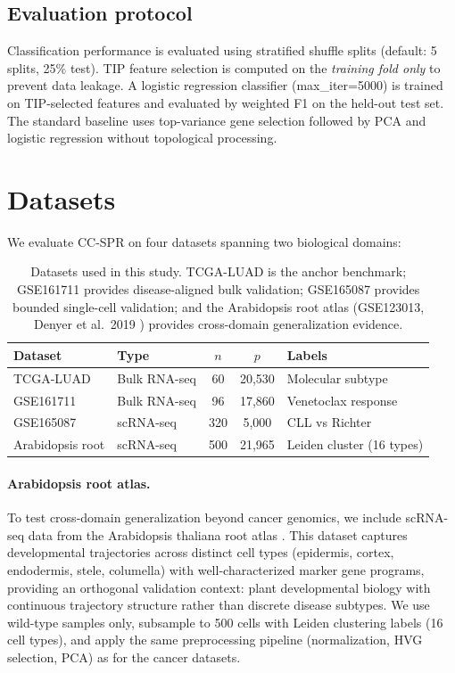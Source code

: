 \documentclass[11pt]{article}
\begin{document}
\subsection{Evaluation protocol}

Classification performance is evaluated using stratified shuffle splits (default: 5 splits, 25\% test).
TIP feature selection is computed on the \emph{training fold only} to prevent data leakage.
A logistic regression classifier (max\_iter=5000) is trained on TIP-selected features and evaluated by weighted F1 on the held-out test set.
The standard baseline uses top-variance gene selection followed by PCA and logistic regression without topological processing.

\section{Datasets}
\label{sec:datasets}

We evaluate CC-SPR on four datasets spanning two biological domains:

\begin{table}[h]
\centering
\small
\begin{tabular}{llccl}
\toprule
\textbf{Dataset} & \textbf{Type} & \textbf{$n$} & \textbf{$p$} & \textbf{Labels} \\
\midrule
TCGA-LUAD & Bulk RNA-seq & 60 & 20{,}530 & Molecular subtype \\
GSE161711 & Bulk RNA-seq & 96 & 17{,}860 & Venetoclax response \\
GSE165087 & scRNA-seq & 320 & 5{,}000 & CLL vs Richter \\
Arabidopsis root & scRNA-seq & 500 & 21{,}965 & Leiden cluster (16 types) \\
\bottomrule
\end{tabular}
\caption{Datasets used in this study. TCGA-LUAD is the anchor benchmark; GSE161711 provides disease-aligned bulk validation; GSE165087 provides bounded single-cell validation; and the Arabidopsis root atlas (GSE123013, Denyer et al.\ 2019 \cite{denyer2019}) provides cross-domain generalization evidence.}
\label{tab:datasets}
\end{table}

\paragraph{Arabidopsis root atlas.}
To test cross-domain generalization beyond cancer genomics, we include scRNA-seq data from the Arabidopsis thaliana root atlas \cite{denyer2019}.
This dataset captures developmental trajectories across distinct cell types (epidermis, cortex, endodermis, stele, columella) with well-characterized marker gene programs, providing an orthogonal validation context: plant developmental biology with continuous trajectory structure rather than discrete disease subtypes.
We use wild-type samples only, subsample to 500 cells with Leiden clustering labels (16 cell types), and apply the same preprocessing pipeline (normalization, HVG selection, PCA) as for the cancer datasets.
\end{document}
